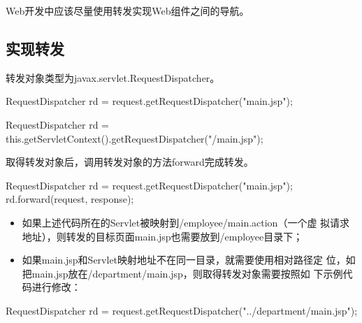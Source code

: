 {\Blue\hei Web开发中应该尽量使用转发实现Web组件之间的导航。}

\subsection{实现转发} 


转发对象类型为javax.servlet.RequestDispatcher。


\begin{javaCode}
  RequestDispatcher rd = request.getRequestDispatcher("main.jsp");
\end{javaCode}


\begin{javaCode}
  RequestDispatcher rd = this.getServletContext().getRequestDispatcher("/main.jsp");
\end{javaCode}

取得转发对象后，调用转发对象的方法forward完成转发。

\begin{javaCode}
  RequestDispatcher rd = request.getRequestDispatcher("main.jsp");
  rd.forward(request, response);
\end{javaCode}


\begin{itemize}\small\kai
\item 如果上述代码所在的Servlet被映射到/employee/main.action（一个虚
  拟请求地址），则转发的目标页面main.jsp也需要放到/employee目录下；
\item 如果main.jsp和Servlet映射地址不在同一目录，就需要使用相对路径定
  位，如把main.jsp放在/department/main.jsp，则取得转发对象需要按照如
  下示例代码进行修改：
\end{itemize}

\begin{javaCode}
  RequestDispatcher rd =
  request.getRequestDispatcher("../department/main.jsp");
\end{javaCode}

